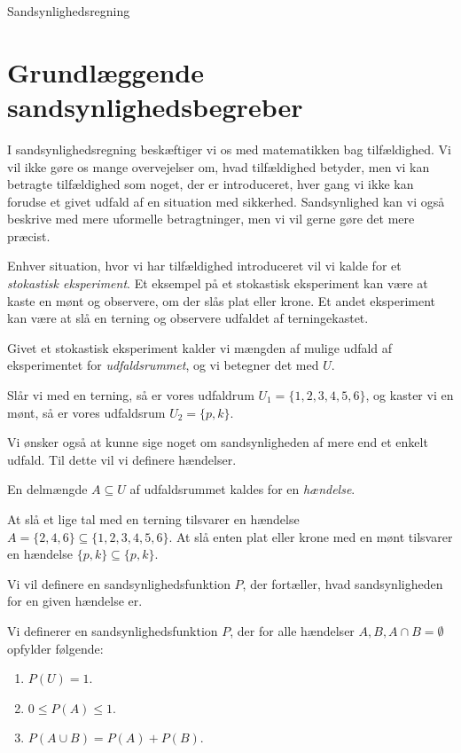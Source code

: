 \begin{center}
\Huge
Sandsynlighedsregning
\end{center}
\section*{Grundlæggende sandsynlighedsbegreber}
I sandsynlighedsregning beskæftiger vi os med matematikken bag tilfældighed. Vi vil ikke gøre os mange overvejelser om, hvad tilfældighed betyder, men vi kan betragte tilfældighed som noget, der er introduceret, hver gang vi ikke kan forudse et givet udfald af en situation med sikkerhed. Sandsynlighed kan vi også beskrive med mere uformelle betragtninger, men vi vil gerne gøre det mere præcist.

Enhver situation, hvor vi har tilfældighed introduceret vil vi kalde for et \textit{stokastisk eksperiment}. Et eksempel på et stokastisk eksperiment kan være at kaste en mønt og observere, om der slås plat eller krone. Et andet eksperiment kan være at slå en terning og observere udfaldet af terningekastet. 
\begin{defn}
Givet et stokastisk eksperiment kalder vi mængden af mulige udfald af eksperimentet for \textit{udfaldsrummet}, og vi betegner det med $U$.
\end{defn}
\begin{exa}
Slår vi med en terning, så er vores udfaldrum $U_1=\{1,2,3,4,5,6\}$, og kaster vi en mønt, så er vores udfaldsrum $U_2 = \{p,k\}$. 
\end{exa}
Vi ønsker også at kunne sige noget om sandsynligheden af mere end et enkelt udfald. Til dette vil vi definere hændelser.
\begin{defn}
En delmængde $A\subseteq U$ af udfaldsrummet kaldes for en \textit{hændelse}. 
\end{defn}
\begin{exa}
At slå et lige tal med en terning tilsvarer en hændelse $A = \{2,4,6\}\subseteq \{1,2,3,4,5,6\}$. At slå enten plat eller krone med en mønt tilsvarer en hændelse $\{p,k\}\subseteq \{p,k\}.$ 
\end{exa}

Vi vil definere en sandsynlighedsfunktion $P$, der fortæller, hvad sandsynligheden for en given hændelse er.
\begin{defn}
Vi definerer en sandsynlighedsfunktion $P$, der for alle hændelser $A,B, A\cap B = \emptyset$ opfylder følgende:
\begin{enumerate}[label=\roman*)]
\item $P(U)=1$.
\item $0 \leq P(A) \leq 1$.
\item $P(A \cup B) = P(A) + P(B)$.
\end{enumerate}
\end{defn}

